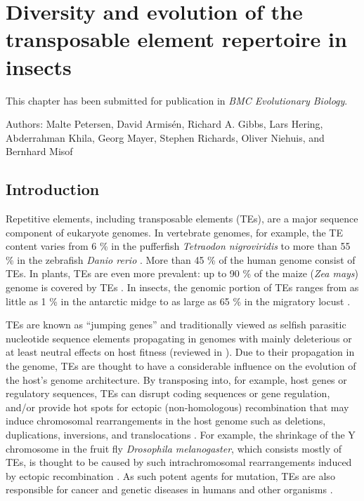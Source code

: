% 

\chapter{Diversity and evolution of the transposable element repertoire
in insects} \label{cha:mobilome}

This chapter has been submitted for publication in \emph{BMC
Evolutionary Biology}.

\noindent Authors: Malte Petersen, David Armisén, Richard A. Gibbs, Lars Hering,
Abderrahman Khila, Georg Mayer, Stephen Richards, Oliver Niehuis, and
Bernhard Misof

\section{Introduction}\label{mobilome-introduction}

Repetitive elements, including transposable elements (TEs), are a major
sequence component of eukaryote genomes. In vertebrate genomes, for
example, the TE content varies from 6 \% in the pufferfish
\emph{Tetraodon nigroviridis} to more than 55 \% in the zebrafish
\emph{Danio rerio} \citep{Chalopin2015}. More than 45 \% of the human
genome \citep{deKoning2011} consist of TEs. In plants, TEs are even more
prevalent: up to 90 \% of the maize (\emph{Zea mays}) genome is covered
by TEs \citep{SanMiguel1996}. In insects, the genomic portion of TEs ranges
from as little as 1 \% in the antarctic midge \citep{Kelley2014} to as
large as 65 \% in the migratory locust \citep{Wang2014}.

TEs are known as ``jumping genes'' and traditionally viewed as selfish
parasitic nucleotide sequence elements propagating in genomes with
mainly deleterious or at least neutral effects on host fitness
\citep{Mackay1989,Pasyukova2004} (reviewed in \citet{Barron2014}). Due to their
propagation in the genome, TEs are thought to have a considerable
influence on the evolution of the host's genome architecture. By
transposing into, for example, host genes or regulatory sequences, TEs
can disrupt coding sequences or gene regulation, and/or provide hot
spots for ectopic (non-homologous) recombination that may induce
chromosomal rearrangements in the host genome such as deletions,
duplications, inversions, and translocations \citep{Burns2012}. For
example, the shrinkage of the Y chromosome in the fruit fly
\emph{Drosophila melanogaster}, which consists mostly of TEs, is thought
to be caused by such intrachromosomal rearrangements induced by ectopic
recombination \citep{Adams2000,Kent2017}. As such potent agents for mutation,
TEs are also responsible for cancer and genetic diseases in humans and
other organisms \citep{Vorechovsky2009,Chenais2015,Hancks2016}.

